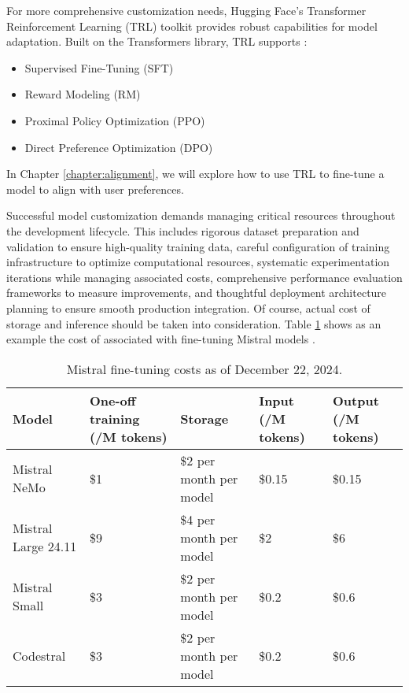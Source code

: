 For more comprehensive customization needs, Hugging Face's Transformer Reinforcement Learning (TRL) toolkit provides robust capabilities for model adaptation. Built on the Transformers library, TRL supports :

\begin{itemize}
    \item Supervised Fine-Tuning (SFT)
    \item Reward Modeling (RM)
    \item Proximal Policy Optimization (PPO)
    \item Direct Preference Optimization (DPO)
\end{itemize}

In Chapter \ref{chapter:alignment}, we will explore how to use TRL to fine-tune a model to align with user preferences.

Successful model customization demands managing critical resources throughout the development lifecycle. This includes rigorous dataset preparation and validation to ensure high-quality training data, careful configuration of training infrastructure to optimize computational resources, systematic experimentation iterations while managing associated costs, comprehensive performance evaluation frameworks to measure improvements, and thoughtful deployment architecture planning to ensure smooth production integration. Of course, actual cost of storage and inference should be taken into consideration. Table \ref{tab:mistral_costs} shows as an example the cost of associated with fine-tuning Mistral models .

\begin{table}[H]
\centering
\caption{Mistral fine-tuning costs as of December 22, 2024.}
\label{tab:mistral_costs}
\begin{tabular}{lllll}
\hline
Model & One-off training (/M tokens) & Storage & Input (/M tokens) & Output (/M tokens) \\
\hline
Mistral NeMo & \$1 & \$2 per month per model & \$0.15 & \$0.15 \\
Mistral Large 24.11 & \$9 & \$4 per month per model & \$2 & \$6 \\
Mistral Small & \$3 & \$2 per month per model & \$0.2 & \$0.6 \\
Codestral & \$3 & \$2 per month per model & \$0.2 & \$0.6 \\
\hline
\end{tabular}
\end{table}

